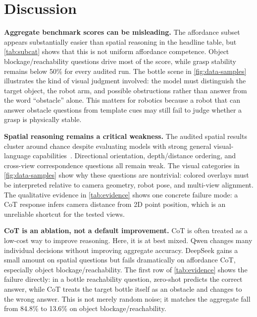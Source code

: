 \section{Discussion}
\label{sec:discussion}

\textbf{Aggregate benchmark scores can be misleading.}
The affordance subset appears substantially easier than spatial reasoning in the headline table, but \cref{tab:subcat} shows that this is not uniform affordance competence. Object blockage/reachability questions drive most of the score, while grasp stability remains below 50\% for every audited run. The bottle scene in \cref{fig:data-samples} illustrates the kind of visual judgment involved: the model must distinguish the target object, the robot arm, and possible obstructions rather than answer from the word ``obstacle'' alone. This matters for robotics because a robot that can answer obstacle questions from template cues may still fail to judge whether a grasp is physically stable.

\textbf{Spatial reasoning remains a critical weakness.}
The audited spatial results cluster around chance despite evaluating models with strong general visual-language capabilities~\cite{bai2025qwen25vl,wu2024deepseekvl2}. Directional orientation, depth/distance ordering, and cross-view correspondence questions all remain weak. The visual categories in \cref{fig:data-samples} show why these questions are nontrivial: colored overlays must be interpreted relative to camera geometry, robot pose, and multi-view alignment. The qualitative evidence in \cref{tab:evidence} shows one concrete failure mode: a CoT response infers camera distance from 2D point position, which is an unreliable shortcut for the tested views.

\textbf{CoT is an ablation, not a default improvement.}
CoT is often treated as a low-cost way to improve reasoning. Here, it is at best mixed. Qwen changes many individual decisions without improving aggregate accuracy. DeepSeek gains a small amount on spatial questions but fails dramatically on affordance CoT, especially object blockage/reachability. The first row of \cref{tab:evidence} shows the failure directly: in a bottle reachability question, zero-shot predicts the correct answer, while CoT treats the target bottle itself as an obstacle and changes to the wrong answer. This is not merely random noise; it matches the aggregate fall from 84.8\% to 13.6\% on object blockage/reachability.

